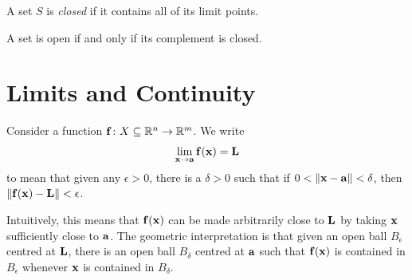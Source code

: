 \documentclass{article}
\begin{document}
\begin{definition}
  A set $S$ is \emph{closed} if it contains all of its limit points.
\end{definition}

\begin{theorem}
  A set is open if and only if its complement is closed.
\end{theorem}

\section{Limits and Continuity}

\begin{definition}[Limit]
  Consider a function $\mathbf{f} \colon X \subseteq \mathbb{R}^n \to \mathbb{R}^m$.
  We write
  \begin{align}
    \lim_{\mathbf{x} \to \mathbf{a}} \mathbf{f}(\mathbf{x}) = \mathbf{L}
  \end{align}
  to mean that given any $\epsilon > 0$, there is a $\delta > 0$ such that if $0 < \norm{\mathbf{x} - \mathbf{a}} < \delta$, then $\norm{\mathbf{f}(\mathbf{x}) - \mathbf{L}} < \epsilon$.
\end{definition}
Intuitively, this means that $\mathbf{f}(\mathbf{x})$ can be made arbitrarily close to $\mathbf{L}$ by taking $\mathbf{x}$ sufficiently close to $\mathbf{a}$.
The geometric interpretation is that given an open ball $B_\epsilon$ centred at $\mathbf{L}$, there is an open ball $B_\delta$ centred at $\mathbf{a}$ such that $\mathbf{f}(\mathbf{x})$ is contained in $B_\epsilon$ whenever $\mathbf{x}$ is contained in $B_\delta$.
\end{document}
